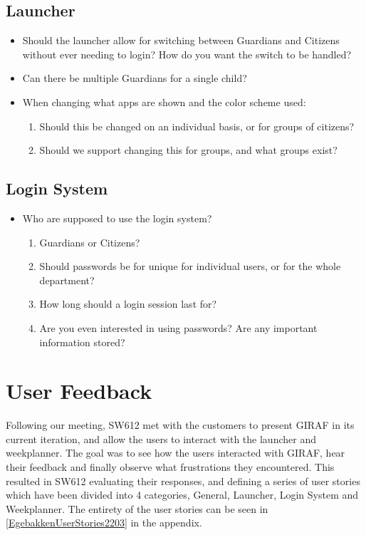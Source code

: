 \subsection{Launcher}
\begin{itemize}
  \item Should the launcher allow for switching between Guardians and Citizens
  without ever needing to login? How do you want the switch to be handled?
  \item Can there be multiple Guardians for a single child?
  \item When changing what apps are shown and the color scheme used:
      \begin{enumerate}
      \item Should this be changed on an individual basis, or for groups of
      citizens?
      \item Should we support changing this for groups, and what groups exist?
    \end{enumerate}
\end{itemize}

\subsection{Login System}
\begin{itemize}
  \item Who are supposed to use the login system?
      \begin{enumerate}
      \item Guardians or Citizens?
      \item Should passwords be for unique for individual users, or for the whole
      department?
      \item How long should a login session last for?
      \item Are you even interested in using passwords? Are any important
      information stored?
    \end{enumerate}
\end{itemize}

\section{User Feedback}
Following our meeting, SW612 met with the customers to present GIRAF in its
current iteration, and allow the users to interact with the launcher and
weekplanner.
The goal was to see how the users interacted with GIRAF, hear their feedback and
finally observe what frustrations they encountered. This resulted in SW612
evaluating their responses, and defining a series of user stories which have
been divided into 4 categories, General, Launcher, Login System and Weekplanner.
The entirety of the user stories can be seen in
\autoref{EgebakkenUserStories2203} in the appendix.\nl

